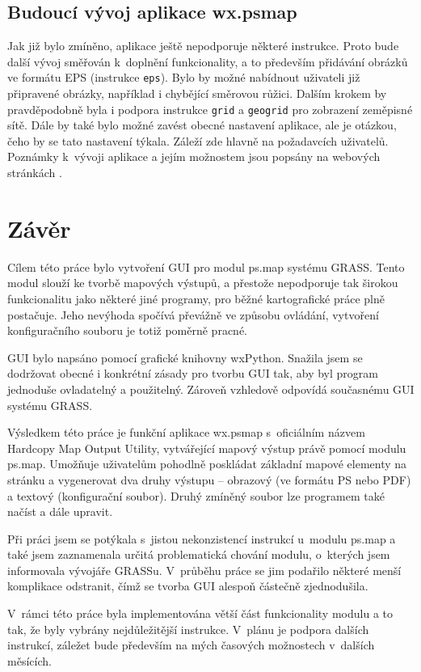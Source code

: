 \documentclass[a4paper,12pt,draft]{article}
\newcommand{\instr}[1]{\lstinline[style=psmapInline]|#1|}
\newcommand{\necislovana}[1]{%
\phantomsection
\addcontentsline{toc}{section}{#1}
\section*{#1}
\markboth{\uppercase{#1}}{}
}
\begin{document}
\subsection{Budoucí vývoj aplikace wx.psmap}
\label{sec:gui:future}
Jak již bylo zmíněno, aplikace ještě nepodporuje některé  instrukce.
Proto bude další vývoj směřován k~doplnění funkcionality, a to především
přidávání obrá\-zků ve formátu EPS (instrukce \instr{eps}). Bylo by možné
nabídnout uživateli již připra\-vené obrázky, například i chybějící
směrovou růžici. Dalším krokem by pravděpo\-dobně byla i podpora instrukce
\instr{grid} a \instr{geogrid} pro zobrazení zeměpisné sítě.
Dále by také bylo možné zavést obecné nastavení aplikace, ale je otázkou, čeho
by se tato nastavení týkala. Záleží zde hlavně na požadavcích uživatelů.
Poznámky k~vývoji aplikace a jejím možnostem jsou popsány na webových stránkách
\cite{trac_wxpsmap}.





\necislovana{Závěr}

Cílem této práce  bylo vytvoření GUI  pro modul
ps.map systému GRASS. Tento modul slouží ke tvorbě mapových
výstupů, a přestože nepodporuje tak širokou funkcionalitu jako některé jiné
programy, pro běžné kartografické práce plně postačuje. Jeho nevýhoda spočívá
převážně ve způsobu ovládání, vytvoření konfiguračního souboru je totiž poměrně
pracné.

GUI bylo napsáno pomocí grafické knihovny wxPython. Snažila jsem
se dodr\-žovat obecné i konkrétní zásady pro tvorbu GUI tak, aby byl program
jednoduše ovladatelný a použitelný. Zároveň vzhledově odpovídá
současnému GUI systému GRASS.

Výsledkem této práce je funkční aplikace wx.psmap s~oficiálním názvem Hardcopy
Map Output Utility, vytvářející mapový výstup právě pomocí modulu
ps.map. Umožňuje uživatelům pohodlně poskládat
základní mapové elementy na stránku a vygenerovat dva druhy výstupu -- obrazový
(ve formátu PS nebo PDF) a textový (konfigurační soubor). Druhý zmíněný
soubor lze programem také načíst a dále upravit.

Při práci jsem se potýkala s~jistou nekonzistencí instrukcí u~modulu
ps.map a také jsem zaznamenala určitá problematická chování modulu, o~kterých
jsem informovala vývojáře GRASSu.
V~průběhu práce se jim podařilo  některé menší komplikace
odstranit, čímž se tvorba GUI alespoň částečně zjednodušila.


V~rámci této práce byla implementována větší část funkcionality modulu a to
tak, že byly vybrány nejdůležitější instrukce. V~plánu je podpora dalších
instrukcí, záležet bude především na mých časových možnostech v~dalších
měsících.
\end{document}
